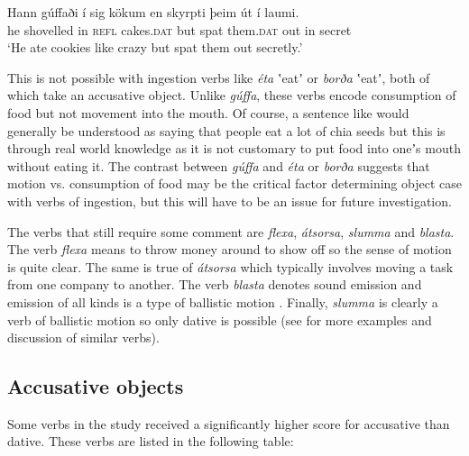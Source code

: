 \documentclass[output=paper,modfonts,nonflat,colorlinks,citecolor=brown]{langsci/langscibook}
\begin{document}
\ea%
    \label{ex:jonsson:4}
\gll     Hann   gúffaði   í   sig   kökum   en   skyrpti   þeim   út   í    laumi.\\
  he   shovelled   in   \textsc{refl}   cakes.\textsc{dat}   but   spat   them\textsc{.dat}   out   in   secret\\
\glt `He ate cookies like crazy but spat them out secretly.'
\z

This is not possible with ingestion verbs like \textit{éta} ʽeatʼ or \textit{borða} ʽeatʼ, both of which take an accusative object. Unlike \textit{gúffa}, these verbs encode consumption of food but not movement into the mouth. Of course, a sentence like  would generally be understood as saying that people eat a lot of chia seeds but this is through real world knowledge as it is not customary to put food into oneʼs mouth without eating it. The contrast between \textit{gúffa} and \textit{éta} or \textit{borða} suggests that motion vs. consumption of food may be the critical factor determining object case with verbs of ingestion, but this will have to be an issue for future investigation.

The verbs that still require some comment are \textit{flexa}, \textit{átsorsa}, \textit{slumma} and \textit{blasta}. The verb \textit{flexa} means to throw money around to show off so the sense of motion is quite clear. The same is true of \textit{átsorsa} which typically involves moving a task from one company to another. The verb \textit{blasta} denotes sound emission and emission of all kinds is a type of ballistic motion \citep{Jónsson2013a}. Finally, \textit{slumma} is clearly a verb of ballistic motion so only dative is possible (see \citealt{Jónsson2013a} for more examples and discussion of similar verbs).

\subsection{Accusative objects} %
\label{sec:jonsson:3.3}

Some verbs in the study received a significantly higher score for accusative than dative. These verbs are listed in the following table:
\end{document}
